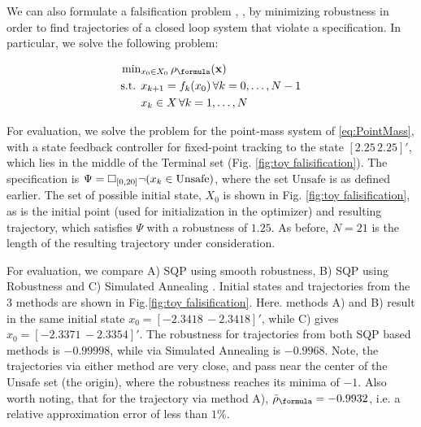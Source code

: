We can also formulate a falsification problem \cite{AbbasATVA11_LinFalsification}, \cite{AbbasF_HybridSA12}, \cite{Deshmukh15_IterativeApproaches} by minimizing robustness in order to find trajectories of a closed loop system that violate a specification. In particular, we solve the following problem:

\begin{subequations}
\label{eq:falsification}
\begin{align}
\text{min}&_{x_0 \in X_0 } \, \rob_{\formula}(\sstraj) \nonumber \\
\text{s.t. } & x_{k+1} = f_k(x_0) \, \forall k=0,\dotsc,N-1 \\
&  x_{k} \in X \, \forall k=1,\dotsc,N
\end{align}
\end{subequations}

For evaluation, we solve the problem for the point-mass system of \eqref{eq:PointMass}, with a state feedback controller for fixed-point tracking to the state $[2.25\,2.25]'$, which lies in the middle of the Terminal set (Fig. \ref{fig:toy falisification}). The specification is $\Psi=\square_{[0,20]} \neg (x_k \in \text{Unsafe})$, where the set $\text{Unsafe}$ is as defined earlier. The set of possible initial state, $X_0$ is shown in Fig. \ref{fig:toy falisification}, as is the initial point (used for initialization in the optimizer) and resulting trajectory, which satisfies $\Psi$ with a robustness of $1.25$. As before, $N=21$ is the length of the resulting trajectory under consideration.

For evaluation, we compare A) SQP using smooth robustness, B) SQP using Robustness and C) Simulated Annealing \cite{SABOOK}. Initial states and trajectories from the 3 methods are shown in Fig.\ref{fig:toy falisification}. Here. methods A) and B) result in the same initial state $x_0=[-2.3418\, -2.3418]'$, while C) gives $x_0=[-2.3371\, -2.3354]'$. The robustness for trajectories from both SQP based methods is $-0.99998$, while via Simulated Annealing is $-0.9968$. Note, the trajectories via either method are very close, and pass near the center of the $\text{Unsafe}$ set (the origin), where the robustness reaches its minima of $-1$. Also worth noting, that for the trajectory via method A), $\srob_{\formula}=-0.9932$, i.e. a relative approximation error of less than $1\%$.

